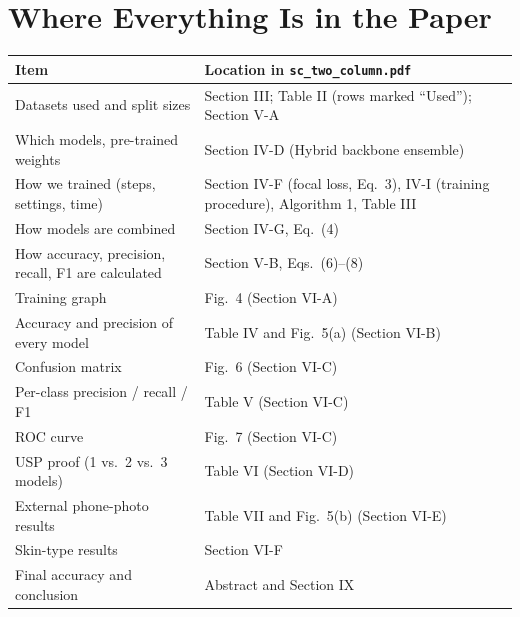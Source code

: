\documentclass[10.5pt,a4paper]{article}
\begin{document}
\section{Where Everything Is in the Paper}
\begin{tabularx}{\linewidth}{@{}L{5.0cm} Y@{}}
\toprule
\textbf{Item} & \textbf{Location in \texttt{sc\_two\_column.pdf}} \\
\midrule
Datasets used and split sizes & Section III; Table II (rows marked ``Used''); Section V-A \\
Which models, pre-trained weights & Section IV-D (Hybrid backbone ensemble) \\
How we trained (steps, settings, time) & Section IV-F (focal loss, Eq.~3), IV-I (training procedure), Algorithm 1, Table III \\
How models are combined & Section IV-G, Eq.~(4) \\
How accuracy, precision, recall, F1 are calculated & Section V-B, Eqs.~(6)--(8) \\
Training graph & Fig.~4 (Section VI-A) \\
Accuracy and precision of every model & Table IV and Fig.~5(a) (Section VI-B) \\
Confusion matrix & Fig.~6 (Section VI-C) \\
Per-class precision / recall / F1 & Table V (Section VI-C) \\
ROC curve & Fig.~7 (Section VI-C) \\
USP proof (1 vs.\ 2 vs.\ 3 models) & Table VI (Section VI-D) \\
External phone-photo results & Table VII and Fig.~5(b) (Section VI-E) \\
Skin-type results & Section VI-F \\
Final accuracy and conclusion & Abstract and Section IX \\
\bottomrule
\end{tabularx}

\end{document}
